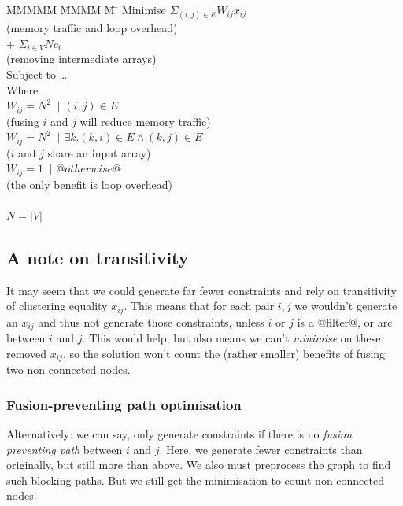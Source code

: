 \begin{tabbing}
MMMMM   \= MMMM \= M \= \kill
Minimise   \>     \> $\Sigma_{(i,j) \in E} W_{ij} x_{ij}$   \\
           \> \> \> (memory traffic and loop overhead)         \\
           \> $+$ \> $\Sigma_{i \in V} N c_i$  \\
           \> \> \> (removing intermediate arrays)         \\
Subject to \> \ldots                                \\
Where      \>                                       \\
           \> $W_{ij} = N^2$ \> $~|$ \> $(i,j) \in E $         \\
           \> \> \> (fusing $i$ and $j$ will reduce memory traffic)         \\
           \> $W_{ij} = N^2$ \> $~|$ \> $\exists k. (k,i) \in E \wedge (k,j) \in E $     \\
           \> \> \> ($i$ and $j$ share an input array)                                         \\
           \> $W_{ij} = 1$   \> $~|$ \> $@otherwise@$                                                  \\
           \> \> \> (the only benefit is loop overhead)                                        \\
           \\
           \> $N = |V|$
\end{tabbing}



\subsection{A note on transitivity}
It may seem that we could generate far fewer constraints and rely on transitivity of clustering equality $x_{ij}$.
This means that for each pair $i,j$ we wouldn't generate an $x_{ij}$ and thus not generate those constraints, unless $i$ or $j$ is a @filter@, or arc between $i$ and $j$.
This would help, but also means we can't \emph{minimise} on these removed $x_{ij}$, so the solution won't count the (rather smaller) benefits of fusing two non-connected nodes.

\subsubsection{Fusion-preventing path optimisation}
\label{s:OptimisedConstraints}
Alternatively:
we can say, only generate constraints if there is no \emph{fusion preventing path} between $i$ and $j$.
Here, we generate fewer constraints than originally, but still more than above.
We also must preprocess the graph to find such blocking paths.
But we still get the minimisation to count non-connected nodes.

